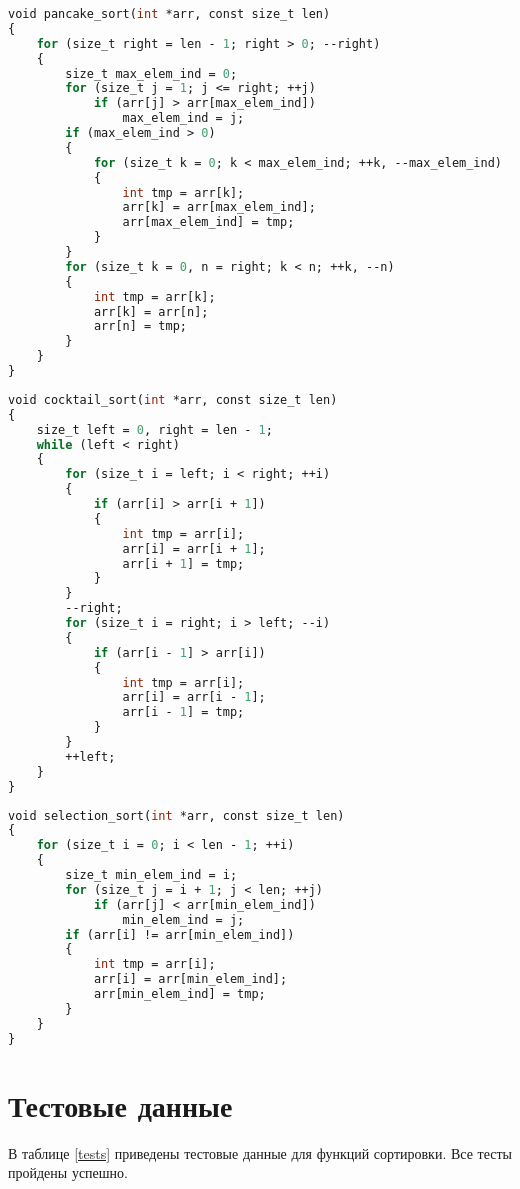 \begin{lstlisting}[label=pancake,caption=Функция блинной сортировки, language=Caml]
void pancake_sort(int *arr, const size_t len)
{
	for (size_t right = len - 1; right > 0; --right)
	{
		size_t max_elem_ind = 0;
		for (size_t j = 1; j <= right; ++j)
			if (arr[j] > arr[max_elem_ind])
				max_elem_ind = j;
		if (max_elem_ind > 0)
		{
			for (size_t k = 0; k < max_elem_ind; ++k, --max_elem_ind)
			{
				int tmp = arr[k];
				arr[k] = arr[max_elem_ind];
				arr[max_elem_ind] = tmp;
			}
		}
		for (size_t k = 0, n = right; k < n; ++k, --n)
		{
			int tmp = arr[k];
			arr[k] = arr[n];
			arr[n] = tmp;
		}
	}
}
\end{lstlisting}
\begin{lstlisting}[label=cocktail,caption=Функция сортировки перемешиванием, language=Caml]
void cocktail_sort(int *arr, const size_t len)
{
	size_t left = 0, right = len - 1;
	while (left < right)
	{
		for (size_t i = left; i < right; ++i)
		{
			if (arr[i] > arr[i + 1])
			{
				int tmp = arr[i];
				arr[i] = arr[i + 1];
				arr[i + 1] = tmp;
			}
		}
		--right;
		for (size_t i = right; i > left; --i)
		{
			if (arr[i - 1] > arr[i])
			{
				int tmp = arr[i];
				arr[i] = arr[i - 1];
				arr[i - 1] = tmp;
			}
		}
		++left;
	}
}
\end{lstlisting}
\begin{lstlisting}[label=selection,caption=Функция сортировки выбором, language=Caml]
void selection_sort(int *arr, const size_t len)
{
	for (size_t i = 0; i < len - 1; ++i)
	{
		size_t min_elem_ind = i;
		for (size_t j = i + 1; j < len; ++j)
			if (arr[j] < arr[min_elem_ind])
				min_elem_ind = j;
		if (arr[i] != arr[min_elem_ind])
		{
			int tmp = arr[i];
			arr[i] = arr[min_elem_ind];
			arr[min_elem_ind] = tmp;
		}
	}
}
\end{lstlisting}

\section{Тестовые данные}

В таблице \ref{tests} приведены тестовые данные для функций сортировки. Все тесты пройдены успешно.

